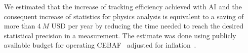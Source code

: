 We estimated that the increase of tracking efficiency achieved with AI and the consequent increase of statistics for physics analysis is equivalent to a saving of more than $4~M$ USD per year by reducing the time needed to reach the desired statistical precision in a measurement. The estimate was done using publicly available budget for operating CEBAF~\cite{CEBAF:oper} adjusted for inflation~\cite{GoogleDotCom}. 



